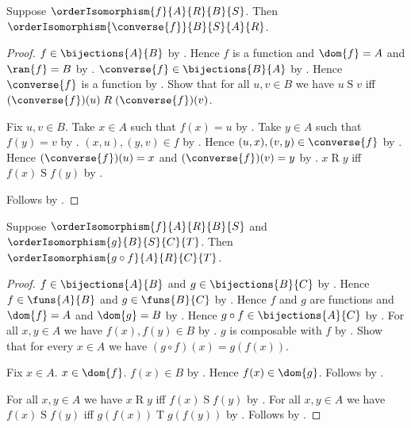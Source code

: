 \begin{proposition}\label{order_isomorphism_inverse}
    Suppose $\orderIsomorphism{f}{A}{R}{B}{S}$.
    Then $\orderIsomorphism{\converse{f}}{B}{S}{A}{R}$.
\end{proposition}
\begin{proof}
    $f\in\bijections{A}{B}$ by .
    Hence $f$ is a function and $\dom{f}=A$ and $\ran{f}=B$
        by
        .
    $\converse{f}\in\bijections{B}{A}$
        by .
    Hence $\converse{f}$ is a function
        by .
    Show that for all $u,v\in B$ we have
        $u\mathrel{S}v$ iff
        $(\converse{f})(u)\mathrel{R}(\converse{f})(v)$.
    \begin{subproof}
        Fix $u,v\in B$.
        Take $x\in A$ such that $f(x)=u$
            by .
        Take $y\in A$ such that $f(y)=v$
            by .
        $(x,u),(y,v)\in f$ by .
        Hence $(u,x),(v,y)\in\converse{f}$ by .
        Hence $(\converse{f})(u)=x$ and
            $(\converse{f})(v)=y$ by .
        $x\mathrel{R}y$ iff $f(x)\mathrel{S}f(y)$
            by .
    \end{subproof}
    Follows by .
\end{proof}

\begin{proposition}\label{order_isomorphism_composition}
    Suppose $\orderIsomorphism{f}{A}{R}{B}{S}$ and
        $\orderIsomorphism{g}{B}{S}{C}{T}$.
    Then $\orderIsomorphism{g\circ f}{A}{R}{C}{T}$.
\end{proposition}
\begin{proof}
    $f\in\bijections{A}{B}$ and $g\in\bijections{B}{C}$
        by .
    Hence $f\in\funs{A}{B}$ and $g\in\funs{B}{C}$
        by .
    Hence $f$ and $g$ are functions and $\dom{f}=A$ and $\dom{g}=B$
        by .
    Hence $g\circ f\in\bijections{A}{C}$
        by .
    For all $x,y\in A$ we have $f(x),f(y)\in B$
        by .
    $g$ is composable with $f$ by .
    Show that for every $x\in A$ we have $(g\circ f)(x)=g(f(x))$.
    \begin{subproof}
        Fix $x\in A$.
        $x\in\dom{f}$.
        $f(x)\in B$ by .
        Hence $f(x)\in\dom{g}$.
        Follows by .
    \end{subproof}
    For all $x,y\in A$ we have
        $x\mathrel{R}y$ iff $f(x)\mathrel{S}f(y)$
        by .
    For all $x,y\in A$ we have
        $f(x)\mathrel{S}f(y)$ iff $g(f(x))\mathrel{T}g(f(y))$
        by .
    Follows by .
\end{proof}

